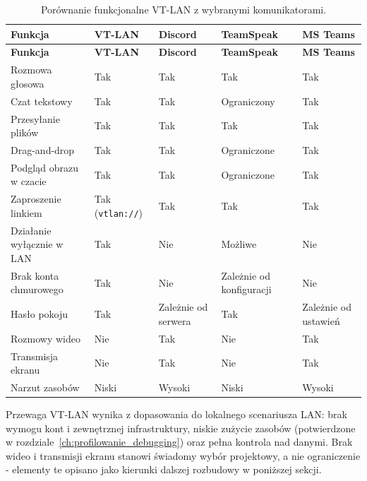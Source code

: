 \begingroup
\scriptsize
\setlength{\LTpre}{6pt}
\setlength{\LTpost}{8pt}
\setlength{\tabcolsep}{3pt}
\renewcommand{\arraystretch}{1.18}
\begin{longtable}{|p{}|p{}|p{}|p{}|p{}|}
	\caption{Porównanie funkcjonalne VT-LAN z wybranymi komunikatorami.}
	\label{tab:ui_porownanie}\\
	\hline
	\textbf{Funkcja} & \textbf{VT-LAN} & \textbf{Discord} &
	\textbf{TeamSpeak} & \textbf{MS Teams} \\
	\hline
	\endfirsthead
	\hline
	\textbf{Funkcja} & \textbf{VT-LAN} & \textbf{Discord} &
	\textbf{TeamSpeak} & \textbf{MS Teams} \\
	\hline
	\endhead
	Rozmowa głosowa          & Tak & Tak & Tak & Tak \\
	\hline
	Czat tekstowy            & Tak & Tak & Ograniczony & Tak \\
	\hline
	Przesyłanie plików       & Tak & Tak & Tak & Tak \\
	\hline
	Drag-and-drop            & Tak & Tak & Ograniczone & Tak \\
	\hline
	Podgląd obrazu w czacie  & Tak & Tak & Ograniczone & Tak \\
	\hline
	Zaproszenie linkiem      & Tak (\texttt{vtlan://}) & Tak & Tak & Tak \\
	\hline
	Działanie wyłącznie w LAN & Tak & Nie & Możliwe & Nie \\
	\hline
	Brak konta chmurowego    & Tak & Nie & Zależnie od konfiguracji & Nie \\
	\hline
	Hasło pokoju             & Tak & Zależnie od serwera & Tak & Zależnie od ustawień \\
	\hline
	Rozmowy wideo            & Nie & Tak & Nie & Tak \\
	\hline
	Transmisja ekranu        & Nie & Tak & Nie & Tak \\
	\hline
	Narzut zasobów           & Niski & Wysoki & Niski & Wysoki \\
	\hline
\end{longtable}
\endgroup

Przewaga VT-LAN wynika z dopasowania do lokalnego scenariusza LAN:
brak wymogu kont i zewnętrznej infrastruktury, niskie zużycie zasobów
(potwierdzone w rozdziale~\ref{ch:profilowanie_debugging}) oraz pełna
kontrola nad danymi. Brak wideo i transmisji ekranu stanowi świadomy
wybór projektowy, a nie ograniczenie - elementy te opisano jako
kierunki dalszej rozbudowy w poniższej sekcji.


